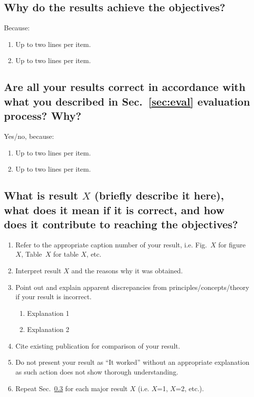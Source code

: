 \subsection{Why do the results achieve the objectives?}
Because:
\begin{enumerate}
\item Up to two lines per item.
\item Up to two lines per item.
\end{enumerate}

\subsection{Are all your results correct in accordance with what you described in Sec.~\ref{sec:eval} evaluation process? Why?} 
Yes/no, because:
\begin{enumerate}
\item Up to two lines per item.
\item Up to two lines per item.
\end{enumerate}
	
\subsection{What is result $X$ (briefly describe it here), what does it mean if it is correct, and how does it contribute to reaching the objectives?}
\label{sec:resn}
		
		\begin{enumerate}		
		\item Refer to the appropriate caption number of your result, i.e. Fig.~$X$ for figure $X$, Table~$X$ for table $X$, etc.	
		\item Interpret result $X$ and the reasons why it was obtained. 
		
		\item Point out and explain apparent discrepancies from principles/concepts/theory if your result is incorrect.
		
		\begin{enumerate}
			\item Explanation 1
			
			\item Explanation 2
		\end{enumerate}
		
		\item Cite existing publication for comparison of your result.
		
		\item Do not present your result as ``It worked'' without an appropriate explanation as such action does not show thorough understanding.
	
						
		\item Repeat Sec.~\ref{sec:resn} for each major result $X$ (i.e. $X$=1, $X$=2, etc.).		
	\end{enumerate}

